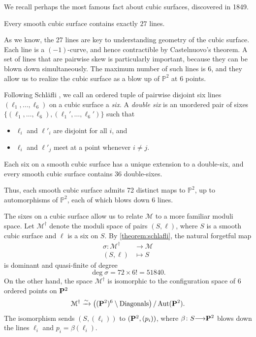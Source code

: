 \documentclass[12pt,reqno]{amsart}
\renewcommand{\to}{{\longrightarrow}}
\numberwithin{equation}{section}
\begin{document}
We recall perhaps the most famous fact about cubic surfaces, discovered in 1849. 
\begin{theorem}
  \label{theorem:cayleysalmon}
  Every smooth cubic surface contains exactly $27$ lines.
\end{theorem}
As we know, the 27 lines are key to understanding geometry of the
cubic surface.  Each line is a $(-1)$-curve, and hence contractible by
Castelnuovo's theorem.  A set of lines that are pairwise skew is
particularly important, because they can be blown down simultaneously.
The maximum number of such lines is 6, and they allow us to realize
the cubic surface as a blow up of $\mathbb P^2$ at 6 points.

Following Schl\"afli \cite{sch:58}, we call an ordered tuple of pairwise disjoint six lines $(\ell_1, \dots, \ell_6)$ on a cubic surface a \emph{six}.
A \emph{double six} is an unordered pair of sixes $\{(\ell_1, \dots, \ell_6), (\ell_1', \dots, \ell_6')\}$ such that
\begin{itemize}
\item $\ell_{i}$ and $\ell'_{i}$ are disjoint for all $i$, and
\item $\ell_{i}$ and $\ell'_{j}$ meet at a point whenever $i \neq j$.
\end{itemize}

\begin{theorem}
  \label{theorem:schlafli} Each six on a smooth cubic surface has a unique extension to a double-six, and every smooth cubic surface contains $36$ double-sixes.
\end{theorem}
Thus, each smooth cubic surface admits 72 distinct maps to
$\mathbb P^2$, up to automorphisms of $\mathbb P^2$, each of which
blows down 6 lines.

The sixes on a cubic surface allow us to relate $\mathcal M$ to a more
familiar moduli space.  Let $\mathcal M^\dagger$ denote the moduli
space of pairs $(S, \ell)$, where $S$ is a smooth cubic surface and
$\ell$ is a six on $S$.  By \autoref{theorem:schlafli}, the natural
forgetful map
\begin{align*}
  \sigma \colon \mathcal M^\dagger &\to \mathcal M \\
  (S, \ell) &\mapsto S
\end{align*}
is dominant and quasi-finite of degree
\[ \deg \sigma = 72 \times 6! = 51840.\] On the other hand, the space
$\mathcal M^\dagger$ is isomorphic to the configuration space of 6
ordered points on $\P^2$
\[ \mathcal M^\dagger \xrightarrow{\sim} \left( (\P^2)^6 \setminus
    \text{Diagonals} \right) / \Aut(\P^2).\] The isomorphism sends
$(S, (\ell_i))$ to $(\P^2, (p_i))$, where $\beta \colon S \to \P^2$
blows down the lines $\ell_i$ and $p_i = \beta(\ell_i)$.
\end{document}
